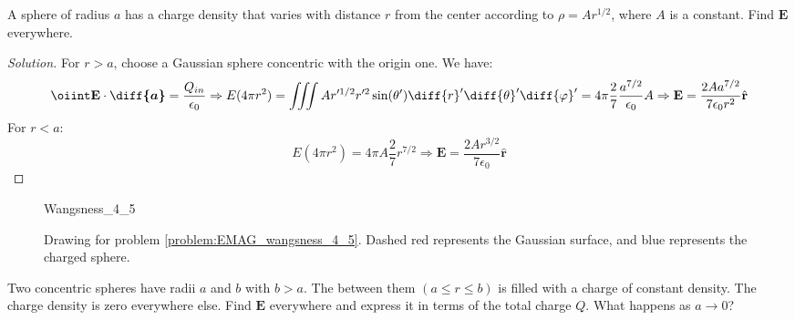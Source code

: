 \documentclass[crop=false,class=article,oneside]{standalone}
\begin{document}
        \begin{problem}[Wangsness 4-5]
            \label{problem:EMAG_wangsness_4_5}
            A sphere of radius $a$ has a charge density that varies
            with distance $r$ from the center according to
            $\rho=Ar^{1/2}$, where $A$ is a constant.
            Find $\mathbf{E}$ everywhere.
        \end{problem}
        \begin{proof}[Solution]
            For $r>a$, choose a Gaussian sphere concentric with
            the origin one. We have:
            \begin{equation*}
                \oiint\mathbf{E}\cdot\boldsymbol{\diff{a}}
                =\frac{Q_{in}}{\epsilon_{0}}\Rightarrow
                E(4\pi r^{2})
                =\iiint{A}r'^{1/2}r'^{2}
                \sin(\theta')\diff{r}'\diff{\theta}'\diff{\varphi}'
                =4\pi\frac{2}{7}\frac{a^{7/2}}{\epsilon_{0}}A
                \Rightarrow\mathbf{E}
                =\frac{2Aa^{7/2}}{7\epsilon_{0}r^{2}}\hat{\mathbf{r}}
            \end{equation*}
            For $r<a$:
            \begin{equation*}
                E(4\pi r^{2})
                =4\pi A\frac{2}{7}r^{7/2}\Rightarrow
                \mathbf{E}
                =\frac{2Ar^{3/2}}{7\epsilon_{0}}\hat{\mathbf{r}}
            \end{equation*}
        \end{proof}
        \begin{figure}[H]
            \centering
            \captionsetup{type=figure}
            {Wangsness_4_5}
            \caption[Drawing for Wangsness 4-3]{%
                Drawing for problem \ref{problem:EMAG_wangsness_4_5}.
                Dashed red represents the Gaussian surface,
                and blue represents the charged sphere.
            }
            \label{fig:EMAG_1_Wangsness_4_5}
        \end{figure}
        \begin{problem}[Wangsness 4-6]
            Two concentric spheres have radii $a$ and $b$ with $b>a$.
            The between them $(a\leq{r}\leq{b})$ is filled with a
            charge of constant density. The charge density is zero
            everywhere else. Find $\mathbf{E}$ everywhere and express
            it in terms of the total charge $Q$.
            What happens as $a\rightarrow{0}$?
        \end{problem}
\end{document}
